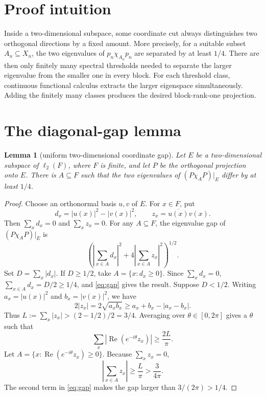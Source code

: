 \documentclass[11pt]{article}
\newtheorem{lemma}[theorem]{Lemma}
\newcommand{\ellTwo}{\ell_2}
\begin{document}
\section{Proof intuition}
Inside a two-dimensional subspace, some coordinate cut always distinguishes
two orthogonal directions by a fixed amount. More precisely, for a suitable
subset $A_n\subseteq X_n$, the two eigenvalues of
$p_n\chi_{A_n}p_n$ are separated by at least $1/4$. There are then only
finitely many spectral thresholds needed to separate the larger eigenvalue
from the smaller one in every block. For each threshold class, continuous
functional calculus extracts the larger eigenspace simultaneously. Adding
the finitely many classes produces the desired block-rank-one projection.
\section{The diagonal-gap lemma}
\begin{lemma}[uniform two-dimensional coordinate gap]\label{lem:gap}
Let $E$ be a two-dimensional subspace of $\ellTwo(F)$, where $F$ is finite,
and let $P$ be the orthogonal projection onto $E$. There is $A\subseteq F$
such that the two eigenvalues of $(P\chi_A P)|_E$ differ by at least $1/4$.
\end{lemma}
\begin{proof}
Choose an orthonormal basis $u,v$ of $E$. For $x\in F$, put
\[
 d_x=|u(x)|^2-|v(x)|^2,\qquad z_x=\overline{u(x)}v(x).
\]
Then $\sum_xd_x=0$ and $\sum_xz_x=0$. For any $A\subseteq F$, the
eigenvalue gap of $(P\chi_A P)|_E$ is
\begin{equation}\label{eq:gap}
 \left(\left|\sum_{x\in A}d_x\right|^2+
 4\left|\sum_{x\in A}z_x\right|^2\right)^{1/2}.
\end{equation}
Set $D=\sum_x|d_x|$. If $D\geq 1/2$, take
$A=\{x:d_x\geq0\}$. Since $\sum_xd_x=0$,
$\sum_{x\in A}d_x=D/2\geq1/4$, and \eqref{eq:gap} gives the result.
Suppose $D<1/2$. Writing $a_x=|u(x)|^2$ and $b_x=|v(x)|^2$, we have
\[
 2|z_x|=2\sqrt{a_xb_x}\geq a_x+b_x-|a_x-b_x|.
\]
Thus $L:=\sum_x|z_x|>(2-1/2)/2=3/4$. Averaging over
$\theta\in[0,2\pi]$ gives a $\theta$ such that
\[
 \sum_x\left|\operatorname{Re}(e^{-i\theta}z_x)\right|\geq\frac{2L}{\pi}.
\]
Let $A=\{x:\operatorname{Re}(e^{-i\theta}z_x)\geq0\}$. Because
$\sum_xz_x=0$,
\[
 \left|\sum_{x\in A}z_x\right|\geq\frac{L}{\pi}>\frac{3}{4\pi}.
\]
The second term in \eqref{eq:gap} makes the gap larger than
$3/(2\pi)>1/4$.
\end{proof}
\end{document}
